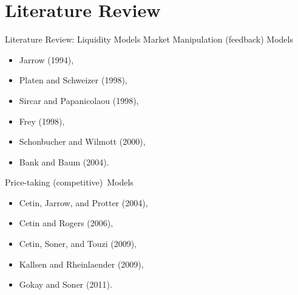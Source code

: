 \documentclass{beamer}
\begin{document}
\section{Literature Review}
\begin{frame}[shrink=30]{{\color{cyan}Literature Review: Liquidity Models}}
\bigskip
Market Manipulation (feedback) Models
\begin{itemize}
\item Jarrow (1994),
\item Platen and Schweizer (1998),
\item Sircar and Papanicolaou (1998),
\item Frey (1998),
\item Schonbucher and Wilmott (2000),
\item Bank and Baum (2004).
\end{itemize}

\bigskip
Price-taking (competitive)\ Models
\begin{itemize}
\item Cetin, Jarrow, and Protter (2004),
\item Cetin and Rogers (2006),
\item Cetin, Soner, and Touzi (2009),
\item Kallsen and Rheinlaender (2009),
\item Gokay and Soner (2011).
\end{itemize}

\end{frame}
\end{document}
